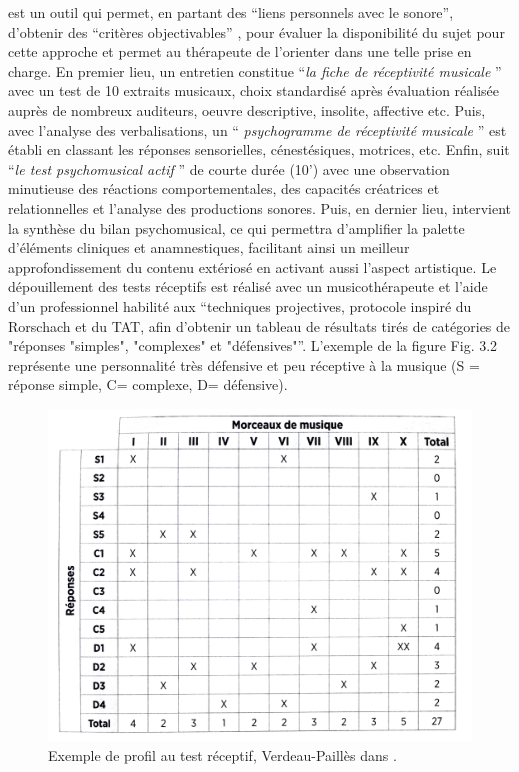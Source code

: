                      est un outil qui permet, en partant des \enquote {liens personnels avec le sonore}, d'obtenir 
                     des \enquote {critères objectivables} \autocite[37]{vrait_musicotherapie_2018}, pour évaluer 
                     la disponibilité du sujet pour cette
                     approche et permet au thérapeute de l'orienter dans
                                 une telle prise en charge. En premier lieu, un entretien constitue \enquote {\textit{la 
                                 fiche de réceptivité musicale} } avec un test de 10 extraits musicaux, choix 
                                 standardisé après évaluation réalisée auprès de nombreux auditeurs, oeuvre 
                                 descriptive, insolite, affective etc.
Puis, avec l'analyse des verbalisations, un \enquote { \textit{psychogramme de réceptivité musicale} } est 
établi en classant les réponses sensorielles, cénestésiques, motrices, etc. Enfin, suit \enquote {\textit{le 
test  psychomusical actif} } \autocite{verdeau_expression} de courte durée (10') avec une observation 
minutieuse des réactions comportementales, des capacités créatrices et relationnelles et l'analyse des 
productions sonores. Puis, en  dernier lieu, intervient la synthèse du bilan psychomusical, ce qui 
permettra d'amplifier la palette d'éléments cliniques et anamnestiques, facilitant ainsi un meilleur 
approfondissement du contenu extériosé en activant aussi l'aspect artistique.
Le dépouillement des tests réceptifs est réalisé avec un musicothérapeute et l'aide d'un professionnel 
habilité aux \enquote {techniques projectives, protocole inspiré du Rorschach et du TAT, afin d'obtenir 
un tableau de résultats tirés de catégories de "réponses "simples", "complexes" et 
"défensives"}\autocite[p.86] {lecourt_les_2017}. L'exemple de la figure Fig. 3.2 représente  
une personnalité très défensive et peu réceptive à la musique (S = réponse 
simple, C= complexe, D= défensive).
\begin{center}       
	\begin{figure}[h]
		\centering
		\label{morceauxDeMusique}
		\includegraphics[width=0.6 \linewidth]{images/graphiques/verdeaupailles.png}	
		\caption[Profil test réceptif Verdeau-Paillès]{Exemple de profil au test réceptif,
		Verdeau-Paillès dans \autocite [89] {lecourt_les_2017}.}
	\end{figure}	
\end{center}



